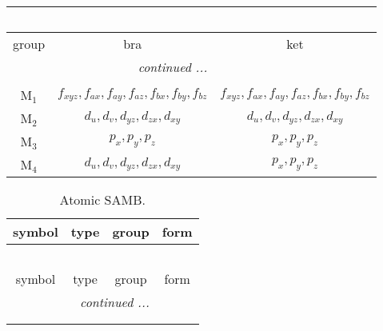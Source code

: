 \documentclass[fleqn,10pt,landscape]{article}
\begin{document}
\begin{itemize}
\begin{center}
\begin{longtable}{c|c|c}
\multicolumn{2}{l}{\tablename\ \thetable{}} \\
 \hline \hline
group & bra & ket \\ \hline \endhead

 \hline \hline
\multicolumn{2}{r}{\footnotesize\it continued ...} \\ \endfoot

 \hline \hline
\multicolumn{2}{r}{} \\ \endlastfoot

M$_{1}$ & $f_{xyz}, f_{ax}, f_{ay}, f_{az}, f_{bx}, f_{by}, f_{bz}$ & $f_{xyz}, f_{ax}, f_{ay}, f_{az}, f_{bx}, f_{by}, f_{bz}$ \\
M$_{2}$ & $d_{u}, d_{v}, d_{yz}, d_{zx}, d_{xy}$ & $d_{u}, d_{v}, d_{yz}, d_{zx}, d_{xy}$ \\
M$_{3}$ & $p_{x}, p_{y}, p_{z}$ & $p_{x}, p_{y}, p_{z}$ \\
M$_{4}$ & $d_{u}, d_{v}, d_{yz}, d_{zx}, d_{xy}$ & $p_{x}, p_{y}, p_{z}$ \\
\end{longtable}
\end{center}
\begin{center}
\renewcommand{\arraystretch}{1.3}
\begin{longtable}{c|c|c|c}
\caption{Atomic SAMB.}
 \\
 \hline \hline
symbol & type & group & form \\ \hline \endfirsthead

\multicolumn{3}{l}{\tablename\ \thetable{}} \\
 \hline \hline
symbol & type & group & form \\ \hline \endhead

 \hline \hline
\multicolumn{3}{r}{\footnotesize\it continued ...} \\ \endfoot

 \hline \hline
\multicolumn{3}{r}{} \\ \endlastfoot


\end{longtable}
\end{center}
\end{itemize}
\end{document}

